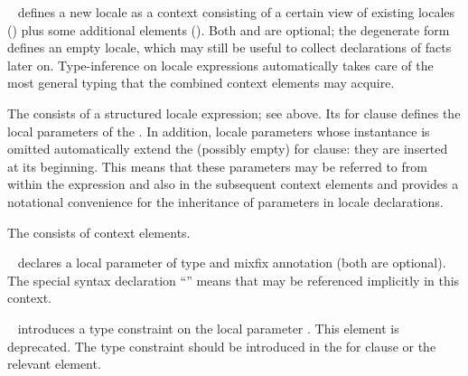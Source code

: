 \begin{isabellebody}
\begin{isamarkuptext}
  \begin{description}
  
  \item \hyperlink{command.locale}{\mbox{}}~ defines a
  new locale  as a context consisting of a certain view of
  existing locales () plus some additional elements
  ().  Both  and  are optional;
  the degenerate form \hyperlink{command.locale}{\mbox{}}~ defines an empty
  locale, which may still be useful to collect declarations of facts
  later on.  Type-inference on locale expressions automatically takes
  care of the most general typing that the combined context elements
  may acquire.

  The  consists of a structured locale expression; see
   above.  Its for clause defines the local
  parameters of the .  In addition, locale parameters
  whose instantance is omitted automatically extend the (possibly
  empty) for clause: they are inserted at its beginning.  This means
  that these parameters may be referred to from within the expression
  and also in the subsequent context elements and provides a
  notational convenience for the inheritance of parameters in locale
  declarations.

  The  consists of context elements.

  \begin{description}

  \item \hyperlink{element.fixes}{\mbox{}}~ declares a local
  parameter of type \isa{{\isasymtau}} and mixfix annotation  (both
  are optional).  The special syntax declaration ``\isa{{\isachardoublequote}{\isacharparenleft}{\isasymSTRUCTURE}{\isacharparenright}{\isachardoublequote}}'' means that  may be referenced
  implicitly in this context.

  \item \hyperlink{element.constrains}{\mbox{}}~ introduces a type
  constraint \isa{{\isasymtau}} on the local parameter .  This
  element is deprecated.  The type constraint should be introduced in
  the for clause or the relevant \hyperlink{element.fixes}{\mbox{}} element.


\end{description}
\end{description}
\end{isamarkuptext}
\end{isabellebody}
